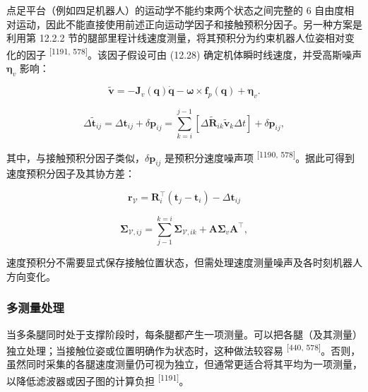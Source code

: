 点足平台（例如四足机器人）的运动学不能约束两个状态之间完整的 6 自由度相对运动，因此不能直接使用前述正向运动学因子和接触预积分因子。另一种方案是利用第 12.2.2 节的腿部里程计线速度测量，将其预积分为约束机器人位姿相对变化的因子 \textsuperscript{[1191, 578]}。该因子假设可由 (12.28) 确定机体瞬时线速度，并受高斯噪声 $\boldsymbol\eta_v$ 影响：

\begin{equation}
\tilde {\boldsymbol {v}} = - \boldsymbol {J} _ {v} (\boldsymbol {q}) \dot {\boldsymbol {q}} - \boldsymbol {\omega} \times \mathbf {f} _ {p} (\boldsymbol {q}) + \boldsymbol {\eta} _ {v}.\tag{12.35}
\end{equation}

\begin{equation}
\Delta \tilde {\boldsymbol {t}} _ {i j} = \Delta \boldsymbol {t} _ {i j} + \delta \boldsymbol {p} _ {i j} = \sum_ {k = i} ^ {j - 1} \left[ \Delta \tilde {\boldsymbol {R}} _ {i k} \tilde {\boldsymbol {v}} _ {k} \Delta t \right] + \delta \boldsymbol {p} _ {i j},\tag{12.36}
\end{equation}

其中，与接触预积分因子类似，$\delta\boldsymbol p_{ij}$ 是预积分速度噪声项 \textsuperscript{[1190, 578]}。据此可得到速度预积分因子及其协方差：

\begin{equation}
\pmb {r} _ {\mathcal {V}} = \pmb {R} _ {i} ^ {\top} (\pmb {t} _ {j} - \pmb {t} _ {i}) - \Delta \pmb {t} _ {i j}\tag{12.37}
\end{equation}

\begin{equation}
\boldsymbol {\Sigma} _ {\mathcal {V}, i j} = \sum_ {j - 1} ^ {k = i} \boldsymbol {\Sigma} _ {\mathcal {V}, i k} + \boldsymbol {A} \boldsymbol {\Sigma} _ {v} \boldsymbol {A} ^ {\top},\tag{12.38}
\end{equation}

速度预积分不需要显式保存接触位置状态，但需处理速度测量噪声及各时刻机器人方向变化。

\subsubsection{多测量处理}

当多条腿同时处于支撑阶段时，每条腿都产生一项测量。可以把各腿（及其测量）独立处理；当接触位姿或位置明确作为状态时，这种做法较容易 \textsuperscript{[440, 578]}。否则，虽然同时采集的各腿速度测量仍可视为独立，但通常更适合将其平均为一项测量，以降低滤波器或因子图的计算负担 \textsuperscript{[1191]}。


